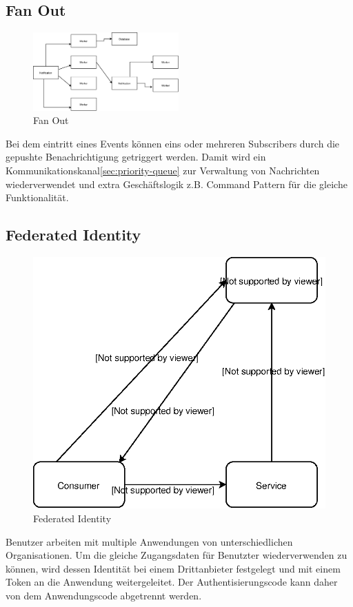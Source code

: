 \documentclass[
12pt,
english,
ngerman,
headsepline,
twoside,
openright,
numbers=noenddot,version=first
]{scrreprt}
\begin{document}
\subsection{Fan Out}
\label{sec:fan-out}
\begin{figure}
	\includegraphics[height=3cm]{./pics/pattern-fan-out.eps}
	\caption{Fan Out}
	\label{pic:fan-out}
\end{figure}
Bei dem eintritt eines Events können eins oder mehreren Subscribers durch die gepushte Benachrichtigung getriggert werden. Damit wird ein Kommunikationskanal\ref{sec:priority-queue} zur Verwaltung von Nachrichten wiederverwendet und extra Geschäftslogik z.B. Command Pattern für die gleiche Funktionalität\cite{serverlessArchAWS}.

\subsection{Federated Identity}
\begin{figure}
	\includegraphics[scale=0.36]{./pics/pattern-federated-identity.eps}
	\caption{Federated Identity}
	\label{pic:federated-identity}
\end{figure}
Benutzer arbeiten mit multiple Anwendungen von unterschiedlichen Organisationen. Um die gleiche Zugangsdaten für Benutzter wiederverwenden zu können, wird dessen Identität bei einem Drittanbieter festgelegt und mit einem Token an die Anwendung weitergeleitet. Der Authentisierungscode kann daher von dem Anwendungscode abgetrennt werden.
\end{document}
